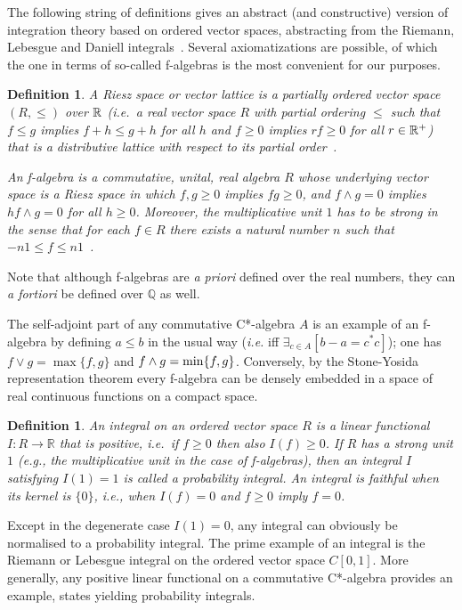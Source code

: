 \documentclass[12pt]{article}
\newcommand{\Q}{\mathbb{Q}}
\newcommand{\alg}[1]{\ensuremath{#1}}
\newcommand{\field}[1]{\ensuremath{\mathbb{#1}}}
\newcommand{\ie}{\textit{i.e.}}
\newtheorem{definition}[theorem]{Definition}
\begin{document}
The following string of definitions gives an abstract (and
constructive) version of integration theory based on ordered vector spaces,
abstracting from the Riemann, Lebesgue and Daniell
integrals~\cite{Coquand/Spitters:integrals-valuations,
coquandspitters05, spitters:caitnoac}.  Several
axiomatizations are possible, of which the one in terms of so-called f-algebras
is the most convenient for our purposes.
\begin{definition}\label{def:falgebra}
  A \emph{Riesz space} or \emph{vector lattice} is a partially ordered
  vector space $(R,\leqslant)$ over ${\mathbb R}$  (\ie\ a real vector space $R$
  with partial ordering $\leqslant$ such that $f \leqslant g$ implies $f+h \leqslant
  g+h$ for all $h$ and $f \geq 0$ implies $rf \geq 0$ for all
  $r\in{\mathbb R}^+$) that is a distributive lattice with respect to its partial
  order~\cite[Definition~11.1]{LuxemburgZaanen}.

  An \emph{f-algebra} is a commutative, unital, real algebra $R$
  whose underlying vector space is a Riesz space in which $f,g \geq
  0$ implies $fg \geq 0$, and $f \wedge g = 0$ implies $hf \wedge g =
  0$ for all $h\geq 0$. Moreover, the multiplicative unit $1$ has to be
  \emph{strong} in the sense that for each $f\in R$ there exists a
  natural number $n$ such that $-n1 \leqslant f \leqslant
  n1$~\cite[Definition~140.8]{Zaanen:RieszII}.
\end{definition}
Note that although f-algebras are {\it a priori} defined over the
real numbers, they can {\it a fortiori} be defined over $\Q$ as well.

The self-adjoint part of any commutative C*-algebra $\alg{A}$ is an
example of an f-algebra by defining $a\leqslant b$ in the usual way (\ie
iff  $\exists_{c \in A}[b-a=c^*c]$); one has $f\vee g=\max\{f,g\}$ and
$f\wedge g=\min\{f,g\}$. Conversely,  by the Stone-Yosida representation
theorem every f-algebra can be densely embedded in a space of real
continuous functions on a compact space.
\begin{definition}
\label{def:probabilityintegral}
  An \emph{integral} on an ordered vector space $R$
  is a linear functional $I:R \to \field{R}$ that is positive,
  \ie\ if $f \geq 0$ then also $I(f) \geq 0$.
  If $R$ has a strong unit $1$ (\emph{e.g.}, the multiplicative unit in the
  case of f-algebras), then an integral $I$ satisfying
  $I(1)=1$ is called a \emph{probability integral}. An integral is
  \emph{faithful} when its kernel is $\{0\}$, \ie, when
  $I(f)=0$ and $f \geq 0$ imply $f=0$.
\end{definition}
Except in the degenerate case $I(1)=0$, any integral can obviously be
normalised to a probability integral.
The prime example of an integral is the Riemann or Lebesgue
integral on the ordered vector space $C[0,1]$. More generally, any
positive linear functional on a commutative C*-algebra provides an example,
states yielding probability integrals.
\end{document}
